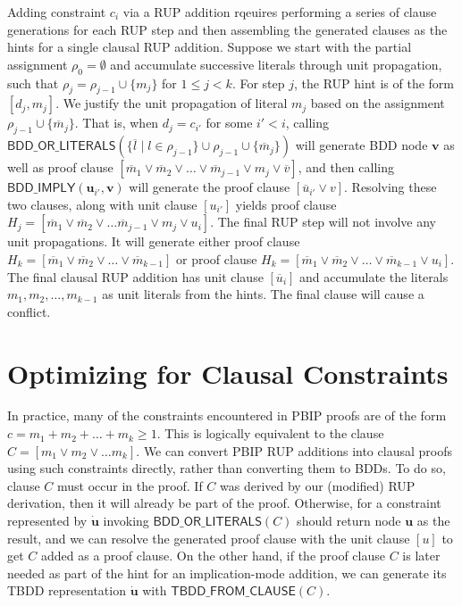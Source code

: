 \documentclass{fmcad}
\begin{document}
Adding constraint $c_i$ via a RUP addition rqeuires performing a series of clause generations for
each RUP step and then assembling the generated clauses as the hints for a single clausal RUP
addition. Suppose we start with the partial assignment $\rho_0 = \emptyset$ and accumulate
successive literals through unit propagation, such that $\rho_j = \rho_{j - 1} \cup \{m_j\}$ for
$1 \leq j < k$. For step $j$, the RUP hint is of the form $[d_j, m_j]$. We justify the unit
propagation of literal $m_j$ based on the assignment $\rho_{j - 1} \cup \{\overline{m}_j\}$. That is,
when $d_j = c_{i'}$ for some $i' < i$, calling
$\mathsf{BDD\_OR\_LITERALS}(\{\overline{l} \mid l \in \rho_{j - 1}\} \cup \rho_{j - 1} \cup \{\overline{m}_j\})$ will generate BDD node $\mathbf{v}$ as well as proof clause
$[\overline{m}_1 \lor \overline{m}_2 \lor \dots \lor \overline{m}_{j - 1} \lor m_j \lor \overline{v}]$,
and then calling $\mathsf{BDD\_IMPLY}(\mathbf{u}_{i'}, \mathbf{v})$ will generate the proof clause
$[\overline{u}_{i'} \lor v]$. Resolving these two clauses, along with unit clause $[u_{i'}]$ yields
proof clause $H_j = [\overline{m}_1 \lor \overline{m}_2 \lor \dots \overline{m}_{j - 1} \lor m_j \lor u_i]$.
The final RUP step will not involve any unit propagations. It will generate either proof clause
$H_k = [\overline{m}_1 \lor \overline{m}_2 \lor \dots \lor \overline{m}_{k - 1}]$ or proof clause
$H_k = [\overline{m}_1 \lor \overline{m}_2 \lor \dots \lor \overline{m}_{k - 1} \lor u_i]$. The final
clausal RUP addition has unit clause $[\overline{u}_i]$ and accumulate the literals
$m_1, m_2, \dots, m_{k - 1}$ as unit literals from the hints. The final clause will cause a conflict.


\section{Optimizing for Clausal Constraints}
In practice, many of the constraints encountered in PBIP proofs are of the form
$c = m_1  + m_2 + \dots + m_k \geq 1$. This is logically equivalent to the clause
$C = [m_1 \lor m_2 \lor \dots m_k]$. We can convert PBIP RUP additions into clausal
proofs using such constraints directly, rather than converting them to BDDs. To do
so, clause $C$ must occur in the proof. If $C$ was derived by our (modified) RUP derivation,
then it will already be part of the proof. Otherwise, for a constraint represented by
$\mathbf{\dot{u}}$ invoking $\mathsf{BDD\_OR\_LITERALS}(C)$ should return node $\mathbf{u}$
as the result, and we can resolve the generated proof clause with the unit clause $[u]$
to get $C$ added as a proof clause. On the other hand, if the proof clause $C$ is later needed
as part of the hint for an implication-mode addition, we can generate its TBDD representation
$\mathbf{\dot{u}}$ with $\mathsf{TBDD\_FROM\_CLAUSE}(C)$.
\end{document}
